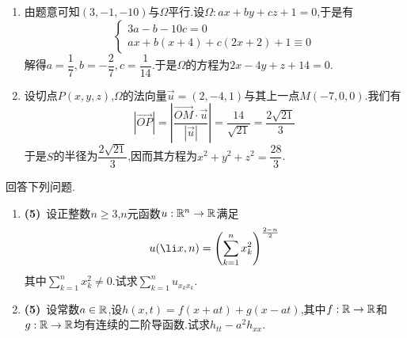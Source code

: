 \documentclass{ctexart}
\begin{document}
\begin{solution}
    \begin{enumerate}[label=\tbf{(\arabic*)}]
        \item 由题意可知$(3,-1,-10)$与$\Omega$平行.设$\Omega:ax+by+cz+1=0$,于是有
            \[\left\{\begin{array}{l}
                3a-b-10c=0\\
                ax+b(x+4)+c(2x+2)+1\equiv0
            \end{array}\right.\]
            解得$a=\dfrac17,b=-\dfrac27,c=\dfrac1{14}$.于是$\Omega$的方程为$2x-4y+z+14=0$.
        \item 设切点$P(x,y,z)$,$\Omega$的法向量$\vec{u}=(2,-4,1)$与其上一点$M(-7,0,0)$.我们有
            \[\left|\overrightarrow{OP}\right|=\left|\dfrac{\overrightarrow{OM}\cdot\vec{u}}{|\vec{u}|}\right|=\dfrac{14}{\sqrt{21}}=\dfrac{2\sqrt{21}}{3}\]
            于是$S$的半径为$\dfrac{2\sqrt{21}}{3}$,因而其方程为$x^2+y^2+z^2=\dfrac{28}{3}$.
    \end{enumerate}
\end{solution}
\begin{problem}[3.(10\songti{分})]
    回答下列问题.
    \begin{enumerate}[label=\tbf{(\arabic*)}]
        \item \textbf{(5)}\ 设正整数$n\geqslant3$,$n$元函数$u:\mathbb{R}^n\to\mathbb{R}$满足
            \[u(\li x,n)=\left(\sum_{k=1}^nx_k^2\right)^{\frac{2-n}{2}}\]
            其中$\displaystyle\sum_{k=1}^nx_k^2\neq0$.试求$\displaystyle\sum_{k=1}^{n}u_{x_kx_k}$.
        \item \textbf{(5)}\ 设常数$a\in\mathbb{R}$,设$h(x,t)=f(x+at)+g(x-at)$,其中$f:\mathbb{R}\to\mathbb{R}$和$g:\mathbb{R}\to\mathbb{R}$均有连续的二阶导函数.试求$h_{tt}-a^2h_{xx}$.
    \end{enumerate}
\end{problem}
\end{document}
